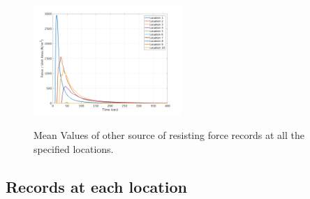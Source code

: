 \documentclass[a4paper,10pt]{article}
\begin{document}
\begin{figure}[H]
	\begin{minipage}[b]{1\linewidth}
	\centering
    \includegraphics[width=0.5\textwidth]{MeansAll/FviscV_all.png}
        \label{fig:M_FviscVall}
	\end{minipage}
				
	\caption{Mean Values of other source of resisting force records at all the specified locations.}\label{fig:M_FoCall}	
\end{figure}

\subsection{Records at each location}\label{sec:MV_loc}
\end{document}
